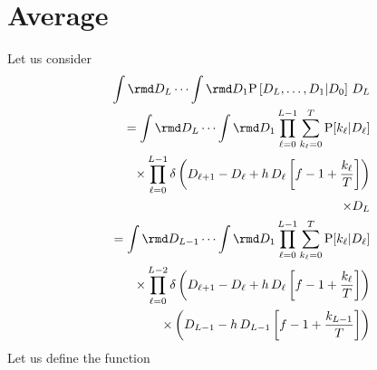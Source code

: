 \documentclass[10pt]{iopart}
\newcommand{\1}{\mathbf{1}}
\newcommand{\Prob}{\mathrm{P}}
\begin{document}
\section{Average}
%
Let us consider
%
\begin{eqnarray}
&&\int\rmd D_{L}\cdots\int\rmd D_{1}\Prob\left[D_{L},\ldots,D_{1}\vert D_{0}\right]
\,D_{L}\nonumber\\
&&=\int\rmd D_{L}\cdots\int\rmd D_{1}\prod_{\ell=0}^{L-1}\sum_{k_\ell=0}^T\Prob[k_\ell\vert D_\ell]\nonumber\\
&&\times\prod_{\ell=0}^{L-1}\delta\left(D_{\ell+1}- D_{\ell}+ h\,D_{\ell}\left[f- 1+\frac{k_{\ell}}{T}\right]\right)\nonumber\\
&&\times D_{L}\nonumber\\
%
&&=\int\rmd D_{L-1}\cdots\int\rmd D_{1}\prod_{\ell=0}^{L-1}\sum_{k_\ell=0}^T\Prob[k_\ell\vert D_\ell]\nonumber\\
&&\times\prod_{\ell=0}^{L-2}\delta\left(D_{\ell+1}- D_{\ell}+ h\,D_{\ell}\left[f- 1+\frac{k_{\ell}}{T}\right]\right)\nonumber\\
%
&&\times \left(D_{L-1}- h\,D_{L-1}\left[f- 1+\frac{k_{L-1}}{T}\right]\right)\nonumber\\
%
\end{eqnarray}
%
Let us define the function  
\end{document}

